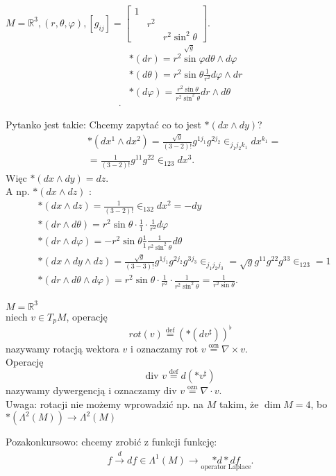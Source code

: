 \documentclass[../main.tex]{subfiles}
\begin{document}
    \begin{przyklad}
        $M = \mathbb{R}^3, (r,\theta,\varphi), \left[ g_{ij} \right] = \begin{bmatrix} 1&&\\&r^2&\\&&r^2\sin^2\theta \end{bmatrix}$.\\
        \begin{align*}
            &\ast(dr) = \overset{\sqrt{g}}{r^2\sin\varphi} d\theta \land d\varphi\\
            &\ast(d\theta) = r^2 \sin\theta \frac{1}{r^2} d\varphi \land dr\\
            &\ast(d\varphi) = \frac{r^2\sin\theta}{r^2\sin^2\theta} dr \land d\theta  \\
        .\end{align*}
    \end{przyklad}
    Pytanko jest takie: Chcemy zapytać co to jest $\ast(dx\land dy)$?\\
     \begin{align*}
         &\ast(dx^1\land dx^2) = \frac{\sqrt{g} }{(3-2)!} g^{1 j_1}g^{2 j_2} \in_{j_1j_2k_1} dx^{k_1} = \\
         &= \frac{1}{(3-2)!}g^{11}g^{22}\in_{123}dx^3
    .\end{align*}
    Więc $\ast(dx\land dy) = dz$.\\
    A np.  $\ast(dx\land dz)$ :
    \begin{align*}
        &\ast(dx\land dz) = \frac{1}{(3-2)!}\in_{132}dx^2 = -dy\\
        &\ast(dr\land d\theta) = r^2\sin\theta \cdot \frac{1}{1}\cdot \frac{1}{r^2}d\varphi \\
        &\ast(dr\land d\varphi) = -r^2\sin\theta \frac{1}{1} \frac{1}{r^2\sin^2\theta} d\theta \\
        &\ast(dx\land dy\land dz) = \frac{\sqrt{g} }{(3-3)!}g^{1 j_1}g^{2 j_2}g^{3 j_3} \in_{j_1 j_2 j_3} = \sqrt{g} g^{11}g^{22}g^{33}\in_{123} = 1\\
        &\ast(dr\land d\theta \land d\varphi) = r^2\sin\theta \cdot \frac{1}{r^2}\cdot \frac{1}{r^2\sin^2\theta} = \frac{1}{r^2\sin\theta}
    .\end{align*}
    \begin{definicja}
        $M = \mathbb{R}^3$\\
        niech $v\in T_pM$, operację
        \[
            rot(v) \overset{\text{def}}{=} \left( \ast\left( dv^\sharp \right)  \right) ^\flat
        \]
        nazywamy rotacją wektora $v$ i oznaczamy
        $\text{rot } v \overset{\text{ozn}}{=} \nabla\times v$.\\
        Operację \[
            \text{div }v \overset{\text{def}}{=} d\left( \ast v^\sharp \right)
        \]
        nazywamy dywergencją i oznaczamy $\text{div }v \overset{\text{ozn}}{=} \nabla \cdot v$.\\
        Uwaga: rotacji nie możemy wprowadzić np. na $M$ takim, że $\dim M = 4$, bo $\ast(\Lambda^2(M))\to \Lambda^2(M)$
    \end{definicja}

    Pozakonkursowo: chcemy zrobić z funkcji funkcję:
    \begin{align*}
        f \overset{d}{\longrightarrow} df \in \Lambda^1(M) \longrightarrow \underset{\text{operator Laplace}}{\ast d \ast df}
    .\end{align*}
\end{document}
